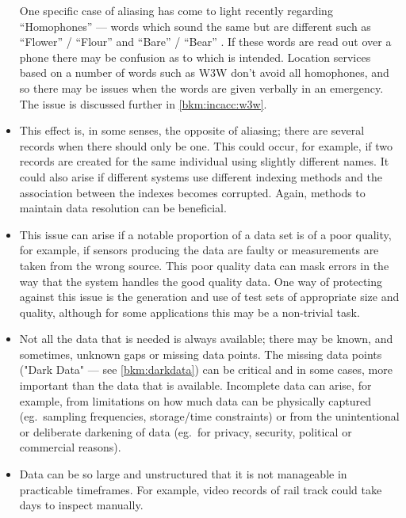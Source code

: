 \begin{itemize}
    One specific case of aliasing has come to light recently regarding ``Homophones'' --- words which sound the same but are different such as ``Flower'' / ``Flour'' and ``Bare'' / ``Bear'' \cite{citation:homonym}.
    If these words are read out over a phone there may be confusion as to which is intended.
    Location services based on a number of words such as W3W don't avoid all homophones,
    and so there may be issues when the words are given verbally in an emergency. The issue is discussed further in \autoref{bkm:incacc:w3w}.

  \item {} This effect is, in some senses, the opposite of aliasing; there are several records when there should only be one. This could occur, for example, if two records are created for the same individual using slightly different names. It could also arise if different systems use different indexing methods and the association between the indexes becomes corrupted. Again, methods to maintain data resolution can be beneficial.

  \item {} This issue can arise if a notable proportion of a data set is of a poor quality, for example, if sensors producing the data are faulty or measurements are taken from the wrong source. This poor quality data can mask errors in the way that the system handles the good quality data. One way of protecting against this issue is the generation and use of test sets of appropriate size and quality, although for some applications this may be a non-trivial task.

  \item {} Not all the data that is needed is always available; there may be known, and sometimes, unknown gaps or missing data points. The missing data points ("Dark Data" --- see \autoref{bkm:darkdata}) can be critical and in some cases, more important than the data that is available. Incomplete data can arise, for example, from limitations on how much data can be physically captured (eg.~sampling frequencies, storage/time constraints) or from the unintentional or deliberate darkening of data (eg.~for privacy, security, political or commercial reasons).

  \item {} Data can be so large and unstructured that it is not manageable in practicable timeframes.
    For example, video records of rail track could take days to inspect manually.


\end{itemize}
